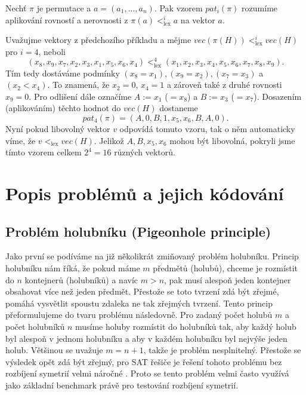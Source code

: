 \begin{definice}
Nechť $\pi$ je permutace a $a = (a_1,...,a_n)$. Pak vzorem $pat_i(\pi)$ rozumíme aplikování rovností a nerovnosti z $\pi(a) <_{\text{lex}}^{i} a$ na vektor $a$.
\end{definice}

\begin{prikl}
Uvažujme vektory z předchozího příkladu a mějme $vec(\pi(H)) <_{\text{lex}}^{i} vec(H)$ pro $i=4$, neboli 
$$(x_8, x_9, x_7, x_2, x_3, x_1, x_5, x_6, x_4) <_{\text{lex}}^{4} (x_1, x_2, x_3, x_4, x_5, x_6, x_7, x_8, x_9).$$
Tím tedy dostáváme podmínky $(x_8 = x_1), (x_9 = x_2), (x_7 = x_3)$ a $(x_2 < x_4)$. To znamená, že $x_2 = 0$, $x_4 = 1$ a zároveň také z druhé rovnosti $x_9 = 0$. Pro odlišení dále označíme $A := x_1$ ($=x_8$) a $B := x_3$ ($=x_7$). Dosazením (aplikováním) těchto hodnot do $vec(H)$ dostaneme 
$$pat_4(\pi) = (A, 0, B, 1, x_5, x_6, B, A, 0).$$
Nyní pokud libovolný vektor $v$ odpovídá tomuto vzoru, tak o něm automaticky víme, že $v <_{\text{lex}} vec(H)$. Jelikož $A, B, x_5, x_6$ mohou být libovolná, pokryli jsme tímto vzorem celkem $2^4 = 16$ různých vektorů.
\end{prikl}

\section{Popis problémů a jejich kódování}
\subsection{Problém holubníku (Pigeonhole principle)}
Jako první se podíváme na již několikrát zmiňovaný problém holubníku. Princip holubníku nám říká, že pokud máme $m$ předmětů (holubů), chceme je rozmístit do $n$ kontejnerů (holubníků) a navíc $m>n$, pak musí alespoň jeden kontejner obsahovat více než jeden předmět. Přestože se toto tvrzení zdá být zřejmé, pomáhá vysvětlit spoustu zdaleka ne tak zřejmých tvrzení. Tento princip přeformulujeme do tvaru problému následovně. Pro zadaný počet holubů $m$ a počet holubníků $n$ musíme holuby rozmístit do holubníků tak, aby každý holub byl alespoň v jednom holubníku a aby v každém holubníku byl nejvýše jeden holub. Většinou se uvažuje $m=n+1$, takže je problém nesplnitelný. Přestože se výsledek opět zdá být zřejmý, pro SAT řešiče je řešení tohoto problému bez rozbíjení symetrií velmi náročné \cite{haken85}. Proto se tento problém velmi často využívá jako základní benchmark právě pro testování rozbíjení symetrií.

